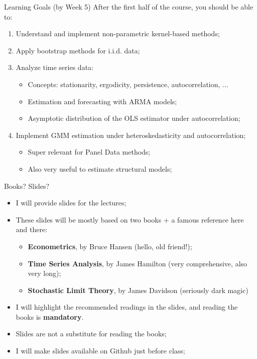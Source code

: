 \documentclass[aspectratio=169, xcolor=dvipsnames, 12pt]{beamer}
\begin{document}
\begin{frame}{Learning Goals (by Week 5)}
  After the first half of the course, you should be able to:

  \begin{enumerate}\itemsep1em
    \item Understand and implement non-parametric kernel-based methods;
    \item Apply bootstrap methods for i.i.d. data;
    \item Analyze time series data:
      \begin{itemize}
        \item Concepts: stationarity, ergodicity, persistence, autocorrelation, ...
        \item Estimation and forecasting with ARMA models;
        \item Asymptotic distribution of the OLS estimator under autocorrelation;
      \end{itemize}
    \item Implement GMM estimation under heteroskedasticity and autocorrelation;
    \begin{itemize}
      \item Super relevant for Panel Data methods;
      \item Also very useful to estimate structural models;
    \end{itemize}
  \end{enumerate}
\end{frame}

\begin{frame}{Books? Slides?}
  \begin{itemize}\itemsep1em
    \item I will provide slides for the lectures;
    \item These slides will be mostly based on two books + a famous reference here and there:
      \begin{itemize}
        \item \textbf{Econometrics}, by Bruce Hansen (hello, old friend!);
        \item \textbf{Time Series Analysis}, by James Hamilton (very comprehensive, also very long);
        \item \textbf{Stochastic Limit Theory}, by James Davidson (seriously dark magic)
      \end{itemize}
    \item I will highlight the recommended readings in the slides, and reading the books is \textbf{mandatory}.
    \item Slides are not a substitute for reading the books;
    \item I will make slides available on Github just before class;
  \end{itemize}
\end{frame}
\end{document}
